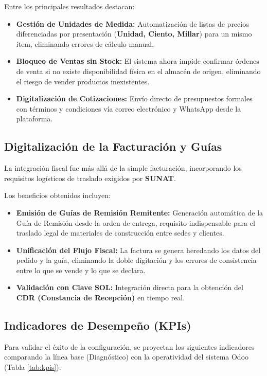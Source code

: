 Entre los principales resultados destacan:
\begin{itemize}
    \item \textbf{Gestión de Unidades de Medida:} Automatización de listas de precios diferenciadas por presentación (\textbf{Unidad, Ciento, Millar}) para un mismo ítem, eliminando errores de cálculo manual.
    \item \textbf{Bloqueo de Ventas sin Stock:} El sistema ahora impide confirmar órdenes de venta si no existe disponibilidad física en el almacén de origen, eliminando el riesgo de vender productos inexistentes.
    \item \textbf{Digitalización de Cotizaciones:} Envío directo de presupuestos formales con términos y condiciones vía correo electrónico y WhatsApp desde la plataforma.
\end{itemize}

\subsection{Digitalización de la Facturación y Guías}
La integración fiscal fue más allá de la simple facturación, incorporando los requisitos logísticos de traslado exigidos por \textbf{SUNAT}.

Los beneficios obtenidos incluyen:
\begin{itemize}
    \item \textbf{Emisión de Guías de Remisión Remitente:} Generación automática de la Guía de Remisión desde la orden de entrega, requisito indispensable para el traslado legal de materiales de construcción entre sedes y clientes.
    \item \textbf{Unificación del Flujo Fiscal:} La factura se genera heredando los datos del pedido y la guía, eliminando la doble digitación y los errores de consistencia entre lo que se vende y lo que se declara.
    \item \textbf{Validación con Clave SOL:} Integración directa para la obtención del \textbf{CDR (Constancia de Recepción)} en tiempo real.
\end{itemize}

\subsection{Indicadores de Desempeño (KPIs)}
Para validar el éxito de la configuración, se proyectan los siguientes indicadores comparando la línea base (Diagnóstico) con la operatividad del sistema Odoo (Tabla \ref{tab:kpis}):

